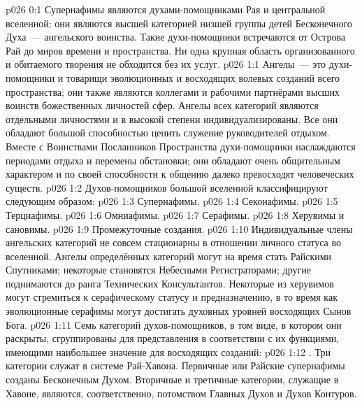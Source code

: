 \author{Совершенствователь Мудрости}
\vs p026 0:1 Супернафимы являются духами\hyp{}помощниками Рая и центральной вселенной; они являются высшей категорией низшей группы детей Бесконечного Духа~--- ангельского воинства. Такие духи\hyp{}помощники встречаются от Острова Рай до миров времени и пространства. Ни одна крупная область организованного и обитаемого творения не обходится без их услуг.
\vs p026 1:1 Ангелы~--- это духи\hyp{}помощники и товарищи эволюционных и восходящих волевых созданий всего пространства; они также являются коллегами и рабочими партнёрами высших воинств божественных личностей сфер. Ангелы всех категорий являются отдельными личностями и в высокой степени индивидуализированы. Все они обладают большой способностью ценить служение руководителей отдыхом. Вместе с Воинствами Посланников Пространства духи\hyp{}помощники наслаждаются периодами отдыха и перемены обстановки; они обладают очень общительным характером и по своей способности к общению далеко превосходят человеческих существ.
\vs p026 1:2 \pc Духов\hyp{}помощников большой вселенной классифицируют следующим образом:
\vs p026 1:3 Супернафимы.
\vs p026 1:4 Секонафимы.
\vs p026 1:5 Терциафимы.
\vs p026 1:6 Омниафимы.
\vs p026 1:7 Серафимы.
\vs p026 1:8 Херувимы и сановимы.
\vs p026 1:9 Промежуточные создания.
\vs p026 1:10 \pc Индивидуальные члены ангельских категорий не совсем стационарны в отношении личного статуса во вселенной. Ангелы определённых категорий могут на время стать Райскими Спутниками; некоторые становятся Небесными Регистраторами; другие поднимаются до ранга Технических Консультантов. Некоторые из херувимов могут стремиться к серафическому статусу и предназначению, в то время как эволюционные серафимы могут достигать духовных уровней восходящих Сынов Бога.
\vs p026 1:11 \pc Семь категорий духов\hyp{}помощников, в том виде, в котором они раскрыты, сгруппированы для представления в соответствии с их функциями, имеющими наибольшее значение для восходящих созданий:
\vs p026 1:12 . Три категории  служат в системе Рай\hyp{}Хавона. Первичные или Райские супернафимы созданы Бесконечным Духом. Вторичные и третичные категории, служащие в Хавоне, являются, соответственно, потомством Главных Духов и Духов Контуров.
